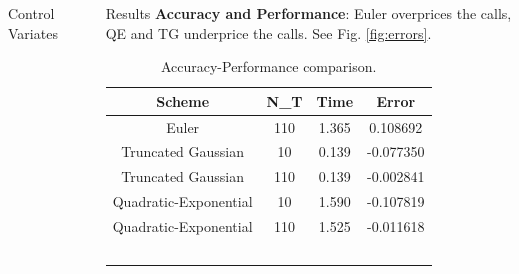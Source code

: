 \documentclass[]{beamer}
\begin{document}
\begin{frame}[t]
\begin{columns}[t]
\begin{column}{\twocolwid}
\begin{columns}[t,totalwidth=\twocolwid]
\begin{column}{\onecolwid}
\begin{block}{Control Variates}
    \end{block}
    
    
    \end{column} %
    
    \end{columns} %
    
    \end{column} %
    
    \begin{column}{\sepwid}\end{column} %
    
    \begin{column}{\onecolwid} %
    
    
    \begin{block}{Results}
        \textbf{Accuracy and Performance}: Euler overprices the calls, QE and TG underprice the calls. See Fig. \ref*{fig:errors}. 
        \begin{table}
        \vspace{2ex}
        \begin{tabular}{c c c c}
            \hline
            \textbf{Scheme} & \textbf{N\_T} & \textbf{Time} & \textbf{Error}\\
            \hline
            Euler                 &      110      &    1.365      &    0.108692   \\\hline
            Truncated Gaussian    &      10       &    0.139      &    -0.077350  \\
            Truncated Gaussian    &      110      &    0.139      &    -0.002841  \\\hline
            Quadratic-Exponential &      10       &    1.590      &    -0.107819  \\
            Quadratic-Exponential &      110      &    1.525      &    -0.011618  \\
            \hline
            \
        \end{tabular}
        \caption{Accuracy-Performance comparison.}
        \end{table}


\end{block}
\end{column}
\end{columns}
\end{frame}
\end{document}
